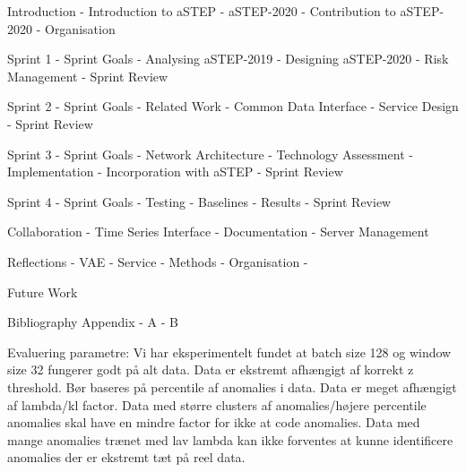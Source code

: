 Introduction
- Introduction to aSTEP
- aSTEP-2020
- Contribution to aSTEP-2020
- Organisation

Sprint 1
- Sprint Goals
- Analysing aSTEP-2019
- Designing aSTEP-2020
- Risk Management
- Sprint Review

Sprint 2
- Sprint Goals
- Related Work
- Common Data Interface
- Service Design
- Sprint Review

Sprint 3
- Sprint Goals
- Network Architecture
- Technology Assessment
- Implementation
- Incorporation with aSTEP
- Sprint Review

Sprint 4
- Sprint Goals
- Testing
- Baselines
- Results
- Sprint Review

Collaboration
- Time Series Interface
- Documentation
- Server Management

Reflections
    - VAE
    - Service
    - Methods
        - Organisation
        -

Future Work

Bibliography
Appendix
- A
- B


Evaluering parametre:
Vi har eksperimentelt fundet at batch size 128 og window size 32 fungerer godt på alt data.
Data er ekstremt afhængigt af korrekt z threshold. Bør baseres på percentile af anomalies i data.
Data er meget afhængigt af lambda/kl factor. Data med større clusters af anomalies/højere percentile anomalies skal have en mindre factor for ikke at code anomalies.
Data med mange anomalies trænet med lav lambda kan ikke forventes at kunne identificere anomalies der er ekstremt tæt på reel data.